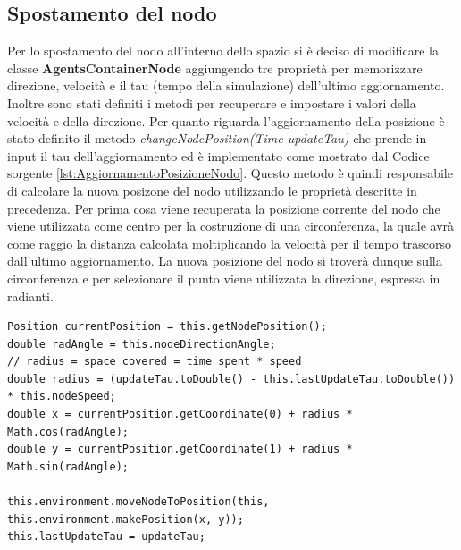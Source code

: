 \documentclass[12pt,a4paper,openright,twoside]{report}
\begin{document}
\subsection{Spostamento del nodo}
Per lo spostamento del nodo all'interno dello spazio si \`e deciso di modificare la classe \textbf{AgentsContainerNode} aggiungendo tre propriet\`a per memorizzare direzione, velocit\`a e il tau (tempo della simulazione) dell'ultimo aggiornamento. Inoltre sono stati definiti i metodi per recuperare e impostare i valori della velocit\`a e della direzione.
Per quanto riguarda l'aggiornamento della posizione \`e stato definito il metodo \textit{changeNodePosition(Time updateTau)} che prende in input il tau dell'aggiornamento ed \`e implementato come mostrato dal Codice sorgente \ref{lst:AggiornamentoPosizioneNodo}.
Questo metodo \`e quindi responsabile di calcolare la nuova posizone del nodo utilizzando le propriet\`a descritte in precedenza. Per prima cosa viene recuperata la posizione corrente del nodo che viene utilizzata come centro per la costruzione di una circonferenza, la quale avr\`a come raggio la distanza calcolata moltiplicando la velocit\`a per il tempo trascorso dall'ultimo aggiornamento. La nuova posizione del nodo si trover\`a dunque sulla circonferenza e per selezionare il punto viene utilizzata la direzione, espressa in radianti.
\medskip
\begin{lstlisting}[label={lst:AggiornamentoPosizioneNodo},caption={Metodo per l'aggiornamento della posizione del nodo}]
Position currentPosition = this.getNodePosition();
double radAngle = this.nodeDirectionAngle;
// radius = space covered = time spent * speed
double radius = (updateTau.toDouble() - this.lastUpdateTau.toDouble()) * this.nodeSpeed;
double x = currentPosition.getCoordinate(0) + radius * Math.cos(radAngle);
double y = currentPosition.getCoordinate(1) + radius * Math.sin(radAngle);

this.environment.moveNodeToPosition(this, this.environment.makePosition(x, y));
this.lastUpdateTau = updateTau;
\end{lstlisting}
\end{document}
